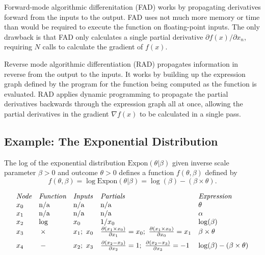 \documentclass[12pt]{article}
\begin{document}
Forward-mode algorithmic differenitation (FAD) works by propagating
derivatives forward from the inputs to the output.  FAD uses not much
more memory or time than would be required to execute the function on
floating-point inputs.  The only drawback is that FAD only calculates
a single partial derivative $\partial f(x)/\partial x_n$, requiring
$N$ calls to calculate the gradient of $f(x)$.

Reverse mode algorithmic differentiation (RAD) propagates information
in reverse from the output to the inputs.  It works by building up the
expression graph defined by the program for the function being
computed as the function is evaluated.  RAD applies dynamic
programming to propagate the partial derivatives backwards through the
expression graph all at once, allowing the partial derivatives in
the gradient $\nabla f(x)$ to be calculated in a single pass.

\subsection{Example: The Exponential Distribution}

The log of the exponential distribution $\mbox{Expon}(\theta|\beta)$
given inverse scale parameter $\beta > 0$ and outcome $\theta > 0$ 
defines a function $f(\theta,\beta)$ defined by
%
\[
f(\theta,\beta) 
= \log \mbox{Expon}(\theta|\beta)
= \log(\beta)  - ( \beta \times \theta ).
\]
%

\[
\begin{array}{lllll}
\mbox{\it Node} & \mbox{\it Function} & \mbox{\it Inputs} & \mbox{\it
  Partials} & \mbox{\it Expression}
\\
x_0 &  \mbox{n/a} & \mbox{n/a} & \mbox{n/a} & \theta
\\
x_1 &  \mbox{n/a} & \mbox{n/a} & \mbox{n/a} & \alpha
\\
x_2 &  \log {} & x_0 & 1/x_0 & \log(\beta)
\\
x_3 &  {} \times {} & x_1; \ x_0 & 
\frac{\partial (x_1 \times x_0)}{\partial x_1} = x_0; \
\frac{\partial (x_1 \times x_0)}{\partial x_0} = x_1
& \beta \times \theta
\\[6pt]
x_4 &  {} - {} & x_2; \ x_3 & 
\frac{\partial (x_2 -x_3)}{\partial x_2} = 1; \ 
\frac{\partial (x_2 - x_3)}{\partial x_3} = -1
& \log(\beta) - (\beta \times \theta)
\end{array}
\]
\end{document}
